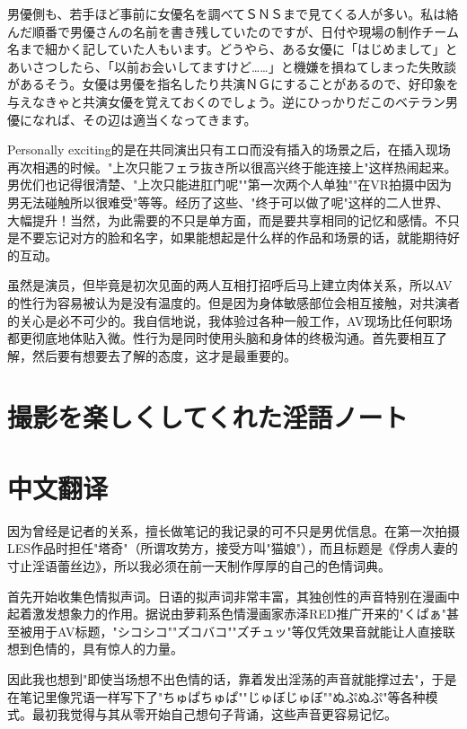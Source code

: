 \documentclass[12pt,UTF8]{ctexbook}
\begin{document}
男優側も、若手ほど事前に女優名を調べてＳＮＳまで見てくる人が多い。私は絡んだ順番で男優さんの名前を書き残していたのですが、日付や現場の制作チーム名まで細かく記していた人もいます。どうやら、ある女優に「はじめまして」とあいさつしたら、「以前お会いしてますけど……」と機嫌を損ねてしまった失敗談があるそう。女優は男優を指名したり共演ＮＧにすることがあるので、好印象を与えなきゃと共演女優を覚えておくのでしょう。逆にひっかりだこのベテラン男優になれば、その辺は適当くなってきます。

Personally exciting的是在共同演出只有エロ而没有插入的场景之后，在插入现场再次相遇的时候。"上次只能フェラ抜き所以很高兴终于能连接上"这样热闹起来。男优们也记得很清楚、"上次只能进肛门呢""第一次两个人单独""在VR拍摄中因为男无法碰触所以很难受"等等。经历了这些、"终于可以做了呢"这样的二人世界、大幅提升！当然，为此需要的不只是单方面，而是要共享相同的记忆和感情。不只是不要忘记对方的脸和名字，如果能想起是什么样的作品和场景的话，就能期待好的互动。

虽然是演员，但毕竟是初次见面的两人互相打招呼后马上建立肉体关系，所以AV的性行为容易被认为是没有温度的。但是因为身体敏感部位会相互接触，对共演者的关心是必不可少的。我自信地说，我体验过各种一般工作，AV现场比任何职场都更彻底地体贴入微。性行为是同时使用头脑和身体的终极沟通。首先要相互了解，然后要有想要去了解的态度，这才是最重要的。

\switchcolumn

\section{撮影を楽しくしてくれた淫語ノート}

\switchcolumn

\section*{中文翻译}

因为曾经是记者的关系，擅长做笔记的我记录的可不只是男优信息。在第一次拍摄LES作品时担任"塔奇"（所谓攻势方，接受方叫"猫娘"），而且标题是《俘虏人妻的寸止淫语蕾丝边》，所以我必须在前一天制作厚厚的自己的色情词典。

首先开始收集色情拟声词。日语的拟声词非常丰富，其独创性的声音特别在漫画中起着激发想象力的作用。据说由萝莉系色情漫画家赤泽RED推广开来的"くぱぁ"甚至被用于AV标题，"シコシコ""ズコバコ""ズチュッ"等仅凭效果音就能让人直接联想到色情的，具有惊人的力量。

因此我也想到"即使当场想不出色情的话，靠着发出淫荡的声音就能撑过去"，于是在笔记里像咒语一样写下了"ちゅぱちゅぱ""じゅぼじゅぼ""ぬぷぬぷ"等各种模式。最初我觉得与其从零开始自己想句子背诵，这些声音更容易记忆。
\end{document}
